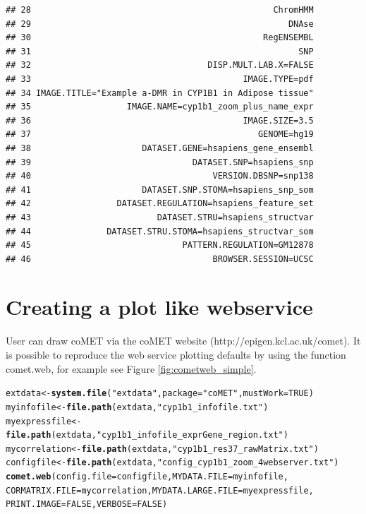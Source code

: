 \documentclass[11pt]{article}\usepackage[]{graphicx}\usepackage[usenames,dvipsnames]{color}
\makeatletter
\newcommand{\hlnum}[1]{\textcolor[rgb]{0.686,0.059,0.569}{#1}}%
\newcommand{\hlstr}[1]{\textcolor[rgb]{0.192,0.494,0.8}{#1}}%
\newcommand{\hlstd}[1]{\textcolor[rgb]{0.345,0.345,0.345}{#1}}%
\newcommand{\hlkwb}[1]{\textcolor[rgb]{0.69,0.353,0.396}{#1}}%
\newcommand{\hlkwc}[1]{\textcolor[rgb]{0.333,0.667,0.333}{#1}}%
\newcommand{\hlkwd}[1]{\textcolor[rgb]{0.737,0.353,0.396}{\textbf{#1}}}%
\newenvironment{kframe}{%
 \def\at@end@of@kframe{}%
 \ifinner\ifhmode%
  \def\at@end@of@kframe{\end{minipage}}%
  \begin{minipage}{\columnwidth}%
 \fi\fi%
 \def\FrameCommand##1{\hskip\@totalleftmargin \hskip-\fboxsep
 \colorbox{shadecolor}{##1}\hskip-\fboxsep
     \hskip-\linewidth \hskip-\@totalleftmargin \hskip\columnwidth}%
 \MakeFramed {\advance\hsize-\width
   \@totalleftmargin\z@ \linewidth\hsize
   \@setminipage}}%
 {\par\unskip\endMakeFramed%
 \at@end@of@kframe}
\newenvironment{knitrout}{}{} %
\makeatother
\begin{document}
\begin{knitrout}
\begin{kframe}
\begin{verbatim}
## 28                                                ChromHMM
## 29                                                   DNAse
## 30                                              RegENSEMBL
## 31                                                     SNP
## 32                                   DISP.MULT.LAB.X=FALSE
## 33                                          IMAGE.TYPE=pdf
## 34 IMAGE.TITLE="Example a-DMR in CYP1B1 in Adipose tissue"
## 35                   IMAGE.NAME=cyp1b1_zoom_plus_name_expr
## 36                                          IMAGE.SIZE=3.5
## 37                                             GENOME=hg19
## 38                      DATASET.GENE=hsapiens_gene_ensembl
## 39                                DATASET.SNP=hsapiens_snp
## 40                                    VERSION.DBSNP=snp138
## 41                      DATASET.SNP.STOMA=hsapiens_snp_som
## 42                 DATASET.REGULATION=hsapiens_feature_set
## 43                         DATASET.STRU=hsapiens_structvar
## 44               DATASET.STRU.STOMA=hsapiens_structvar_som
## 45                              PATTERN.REGULATION=GM12878
## 46                                    BROWSER.SESSION=UCSC
\end{verbatim}
\end{kframe}
\end{knitrout}

\section{Creating a plot like webservice}
User can draw coMET via the coMET website (http://epigen.kcl.ac.uk/comet).
It is possible to reproduce the web service plotting defaults by using the function comet.web, for example see Figure \ref{fig:cometweb_simple}.

\begin{knitrout}
\color{fgcolor}\begin{kframe}
\begin{alltt}
\hlstd{extdata} \hlkwb{<-} \hlkwd{system.file}\hlstd{(}\hlstr{"extdata"}\hlstd{,} \hlkwc{package}\hlstd{=}\hlstr{"coMET"}\hlstd{,}\hlkwc{mustWork}\hlstd{=}\hlnum{TRUE}\hlstd{)}
\hlstd{myinfofile} \hlkwb{<-} \hlkwd{file.path}\hlstd{(extdata,} \hlstr{"cyp1b1_infofile.txt"}\hlstd{)}
\hlstd{myexpressfile} \hlkwb{<-} \hlkwd{file.path}\hlstd{(extdata,} \hlstr{"cyp1b1_infofile_exprGene_region.txt"}\hlstd{)}
\hlstd{mycorrelation} \hlkwb{<-} \hlkwd{file.path}\hlstd{(extdata,} \hlstr{"cyp1b1_res37_rawMatrix.txt"}\hlstd{)}
\hlstd{configfile} \hlkwb{<-} \hlkwd{file.path}\hlstd{(extdata,} \hlstr{"config_cyp1b1_zoom_4webserver.txt"}\hlstd{)}
\hlkwd{comet.web}\hlstd{(}\hlkwc{config.file}\hlstd{=configfile,} \hlkwc{MYDATA.FILE}\hlstd{=myinfofile,}
          \hlkwc{CORMATRIX.FILE}\hlstd{=mycorrelation ,}\hlkwc{MYDATA.LARGE.FILE}\hlstd{=myexpressfile,}
          \hlkwc{PRINT.IMAGE}\hlstd{=}\hlnum{FALSE}\hlstd{,}\hlkwc{VERBOSE}\hlstd{=}\hlnum{FALSE}\hlstd{)}
\end{alltt}
\end{kframe}
\end{knitrout}
\end{document}
